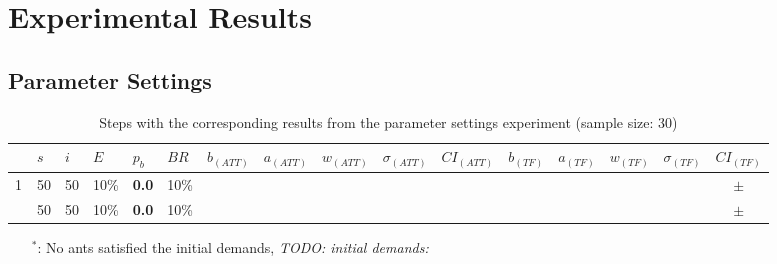 \chapter{Experimental Results}
\label{appendixC}

\section{Parameter Settings}

\begin{sidewaystable}
    \hspace*{-0.5cm}
    \begin{tabular}{|l|l|l|l|l|l||c|c|c|c|c|c|c|c|c|c|}
    \hline
    ~ & $s$ & $i$ & $E$ & $p_{b}$ & $BR$ & $b_{(ATT)}$ & $a_{(ATT)}$ & $w_{(ATT)}$ & $\sigma_{(ATT)}$ & $CI_{(ATT)}$ & $b_{(TF)}$ & $a_{(TF)}$ & $w_{(TF)}$ & $\sigma_{(TF)}$ & $CI_{(TF)}$\\
    \hline
    1 & 50 & 50 & 10\% & \textbf{0.0} & 10\% & ~ & ~ & ~ & ~ & ~ ~ & ~ & ~ & ~ & ~ & ~ $\pm$ ~\\
    ~ & 50 & 50 & 10\% & \textbf{0.0} & 10\% & ~ & ~ & ~ & ~ & ~ ~ & ~ & ~ & ~ & ~ & ~ $\pm$ ~\\
    \hline
    \end{tabular}
    \caption {Steps with the corresponding results from the parameter settings experiment (sample size: 30)}
    \tiny
    \begin{itemize}[noitemsep]
    \item[$^*$:] No ants satisfied the initial demands, \emph{\color{blue} TODO: initial demands: }
    \end{itemize}
    \label{table:pm1}
\end{sidewaystable}



